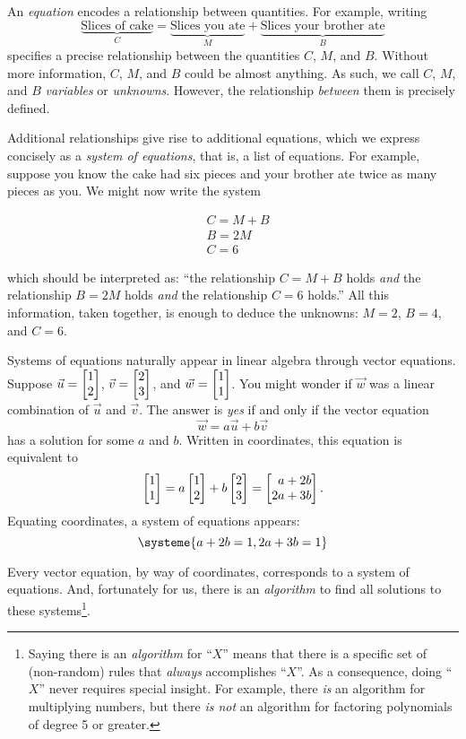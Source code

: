 	An \emph{equation} encodes a relationship between quantities. For
	example, writing
	\[
		\underbrace{\text{Slices of cake}}_C = \underbrace{\text{Slices you ate}}_M + \underbrace{\text{Slices your brother ate}}_B
	\]
	specifies a precise relationship between the quantities $C$, $M$, and $B$. 
	Without more information, $C$, $M$, and $B$ could be almost anything. As such, we call 
	$C$, $M$, and $B$
	\emph{variables} or \emph{unknowns}. 
	However, the
	relationship \emph{between} them is precisely defined. 

	Additional relationships give rise to additional equations, which we express concisely as a
	\emph{system of equations}, that is, a list of equations. For example, suppose you know the cake
	had six pieces and your brother ate twice as many pieces as you. We might now write the system
 
	\begin{align*}
  		&C = M + B \\
  		&B = 2M \\
  		&C = 6
	\end{align*}
 
	which should be interpreted as: ``the relationship $C=M+B$ holds \emph{and} the relationship $B=2M$ holds \emph{and}
	the relationship $C=6$ holds.''
	All this information, taken together, is enough to deduce the unknowns: $M=2$, $B=4$, and $C=6$.

	Systems of equations naturally appear in linear algebra through vector equations. Suppose $\vec u=\mat{1\\2}$, $\vec v=\mat{2\\3}$,
	and $\vec w=\mat{1\\1}$. You might wonder if $\vec w$ was a linear combination of $\vec u$ and $\vec v$. The answer is \emph{yes} if and
	only if the vector equation
	\[
		\vec w=a\vec u+b\vec v
	\]
	has a solution for some $a$ and $b$. Written in coordinates, this equation is equivalent to
	\[
		\mat{1\\1}=a\mat{1\\2}+b\mat{2\\3} = \mat{a+2b\\2a+3b}.
	\]
	Equating coordinates, a system of equations appears:
	\[
		\systeme{a+2b=1,2a+3b=1}
	\]

	Every vector equation, by way of coordinates, corresponds to a system of equations. And, fortunately for us, there is
	an \emph{algorithm} to find all solutions to these systems\footnote{ Saying there is an \emph{algorithm} for ``$X$''
	means that there is a specific set of (non-random) rules that \emph{always} accomplishes ``$X$''. As a consequence, doing
	``$X$'' never requires special insight. For example, there \emph{is} an algorithm for multiplying numbers, but there \emph{is not}
	an algorithm for factoring polynomials of degree 5 or greater.}.

